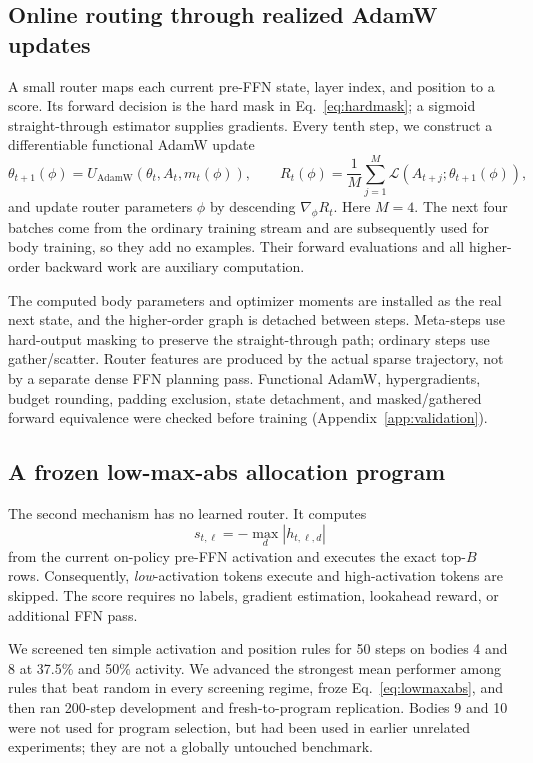 \documentclass{article}
\begin{document}
\subsection{Online routing through realized AdamW updates}
\label{sec:meta-method}
A small router maps each current pre-FFN state, layer index, and position to a
score. Its forward decision is the hard mask in Eq.~\eqref{eq:hardmask}; a
sigmoid straight-through estimator supplies gradients. Every tenth step, we
construct a differentiable functional AdamW update
\begin{equation}
\theta_{t+1}(\phi)=U_{\mathrm{AdamW}}
\!\left(\theta_t,A_t,m_t(\phi)\right),
\qquad
R_t(\phi)=\frac{1}{M}\sum_{j=1}^{M}\mathcal L(A_{t+j};\theta_{t+1}(\phi)),
\label{eq:meta}
\end{equation}
and update router parameters $\phi$ by descending $\nabla_\phi R_t$. Here $M=4$.
The next four batches come from the ordinary training stream and are
subsequently used for body training, so they add no examples. Their forward
evaluations and all higher-order backward work are auxiliary computation.

The computed body parameters and optimizer moments are installed as the real
next state, and the higher-order graph is detached between steps. Meta-steps
use hard-output masking to preserve the straight-through path; ordinary steps
use gather/scatter. Router features are produced by the actual sparse
trajectory, not by a separate dense FFN planning pass. Functional AdamW,
hypergradients, budget rounding, padding exclusion, state detachment, and
masked/gathered forward equivalence were checked before training
(Appendix~\ref{app:validation}).

\subsection{A frozen low-max-abs allocation program}
\label{sec:program-method}
The second mechanism has no learned router. It computes
\begin{equation}
s_{t,\ell}=-\max_d |h_{t,\ell,d}|
\label{eq:lowmaxabs}
\end{equation}
from the current on-policy pre-FFN activation and executes the exact top-$B$
rows. Consequently, \emph{low}-activation tokens execute and high-activation
tokens are skipped. The score requires no labels, gradient estimation,
lookahead reward, or additional FFN pass.

We screened ten simple activation and position rules for 50 steps on bodies 4
and 8 at 37.5\% and 50\% activity. We advanced the strongest mean performer
among rules that beat random in every screening regime, froze
Eq.~\eqref{eq:lowmaxabs}, and then ran 200-step development and fresh-to-program
replication. Bodies 9 and 10 were not used for program selection, but had been
used in earlier unrelated experiments; they are not a globally untouched
benchmark.
\end{document}
